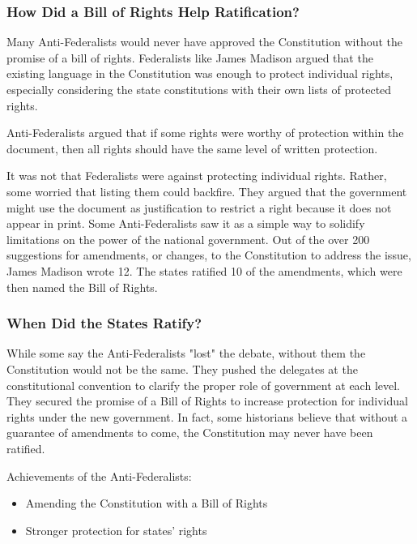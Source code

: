 \subsubsection*{How Did a Bill of Rights Help Ratification?}

Many Anti-Federalists would never have approved the Constitution without the
promise of a bill of rights. Federalists like James Madison argued that the
existing language in the Constitution was enough to protect individual rights,
especially considering the state constitutions with their own lists of protected
rights.

Anti-Federalists argued that if some rights were worthy of protection within the
document, then all rights should have the same level of written protection.

It was not that Federalists were against protecting individual rights. Rather,
some worried that listing them could backfire. They argued that the government
might use the document as justification to restrict a right because it does not
appear in print. Some Anti-Federalists saw it as a simple way to solidify
limitations on the power of the national government. Out of the over 200
suggestions for amendments, or changes, to the Constitution to address the
issue, James Madison wrote 12. The states ratified 10 of the amendments, which
were then named the Bill of Rights.

\subsubsection*{When Did the States Ratify?}

While some say the Anti-Federalists "lost" the debate, without them the
Constitution would not be the same. They pushed the delegates at the
constitutional convention to clarify the proper role of government at each
level. They secured the promise of a Bill of Rights to increase protection for
individual rights under the new government. In fact, some historians believe
that without a guarantee of amendments to come, the Constitution may never have
been ratified.

Achievements of the Anti-Federalists:

\begin{itemize}
    \item Amending the Constitution with a Bill of Rights
    \item Stronger protection for states' rights
\end{itemize}

